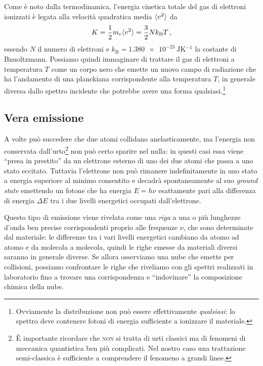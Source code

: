         Come è noto dalla termodinamica, l'energia cinetica totale del gas di elettroni ionizzati è legata alla velocità quadratica media $\langle v^2\rangle$ da
        \begin{equation}
            K = \frac{1}{2}m_\text{e}\langle v^2\rangle = \frac{3}{2} N k_\text{B} T
            \,,
        \end{equation}
        essendo $N$ il numero di elettroni e $k_\text{B} = \SI{1.380e-23}{\joule\kelvin^{-1}}$ la costante di Bnuoltzmann. Possiamo quindi immaginare di trattare il gas di elettroni a temperatura $T$ come un corpo nero che emette un nuovo campo di radiazione che ha l'andamento di una planckiana corrispondente alla temperatura $T$, in generale diversa dallo spettro incidente che potrebbe avere una forma qualsiasi.\footnote{Ovviamente la distribuzione non può essere effettivamente \emph{qualsiasi}: lo spettro deve contenere fotoni di energia sufficiente a ionizzare il materiale.}
    \subsection{Vera emissione}
        A volte può succedere che due atomi collidano anelasticamente, ma l'energia non conservata dall'urto\footnote{È importante ricordare che \textsc{non} si tratta di urti classici ma di fenomeni di meccanica quantistica ben più complicati. Nel nostro caso una trattazione semi-classica è sufficiente a comprendere il fenomeno a grandi linee.} non può certo sparire nel nulla: in questi casi essa viene ``presa in prestito'' da un elettrone esterno di uno dei due atomi che passa a uno stato eccitato. Tuttavia l'elettrone non può rimanere indefinitamente in uno stato a energia superiore al minimo consentito e decadrà spontaneamente al suo \emph{ground state} emettendo un fotone che ha energia $E = h\nu$ esattamente pari alla differenza di energia $\Delta E$ tra i due livelli energetici occupati dall'elettrone.

        Questo tipo di emissione viene rivelata come una \emph{riga} 
        a una o più lunghezze d'onda ben precise corrispondenti proprio alle frequenze $\nu$, che sono determinate dal materiale: le differenze tra i vari livelli energetici cambiano da atomo ad atomo e da molecola a molecola, quindi le righe emesse da materiali diversi saranno in generale diverse. Se allora osserviamo una nube che emette per collisioni, possiamo confrontare le righe che riveliamo con gli spettri realizzati in laboratorio fino a trovare una corrispondenza e ``indovinare'' la composizione chimica della nube.
